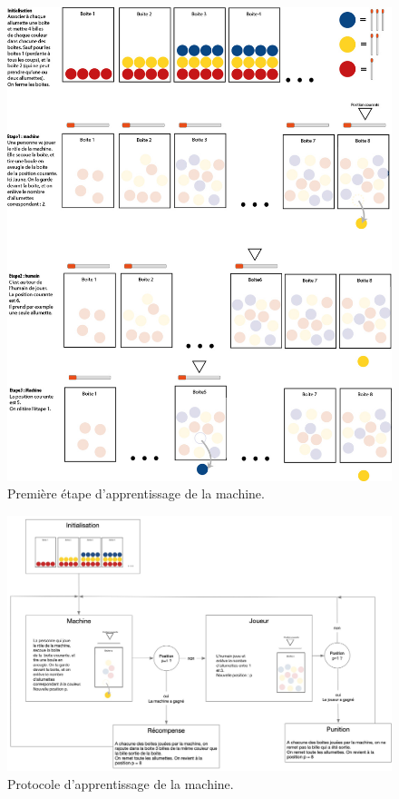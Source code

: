 \documentclass[a4paper,12pt]{article}
\begin{document}
\begin{figure}[h!]
\centering
\includegraphics[scale = 0.7]{./Images/fig3-v2.jpg}
\caption{Première étape d'apprentissage de la machine.}
\label{fig:PremApprentissage}
\end{figure}

\begin{figure}[h!]
\centering
\includegraphics[scale = 0.9]{./Images/fig1-v3.jpg}
\caption{Protocole d'apprentissage de la machine.}
\label{fig:ProtocoleApprentissage}
\end{figure}
\end{document}
